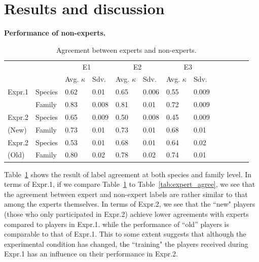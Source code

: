 \section{Results and discussion}
\label{sec:res}
\noindent
\textbf{Performance of non-experts.}
\begin{table}[t!]
\centering
\caption{Agreement between experts and non-experts. } 
\begin{tabular}{@{}l@{~~}l@{~~}l@{~~~}l@{~~}l@{~~~}l@{~~}l@{~~~}l@{~~}l@{~~~}l@{~~}l@{~~~}l@{~}l@{}}
\toprule
& & \multicolumn{2}{c}{E1} & \multicolumn{2}{c}{E2} & \multicolumn{2}{c}{E3}\\ 
& & Avg. $\kappa$ & Sdv. & Avg. $\kappa$ & Sdv. & Avg. $\kappa$ & Sdv. \\
\hline
Expr.1 & Species & 0.62 & 0.01 & 0.65 & 0.006 & 0.55 & 0.009 \\  
& Family & 0.83 & 0.008 & 0.81 & 0.01 & 0.72 & 0.009\\
\hline
Expr.2 & Species & 0.65 & 0.009 & 0.50 & 0.008 & 0.45 & 0.009\\
(New)& Family & 0.73 & 0.01 & 0.73 & 0.01 & 0.68 & 0.01\\
\hline
Expr.2 & Species &0.53 & 0.01& 0.68 & 0.01 & 0.64 & 0.02 \\
(Old)& Family & 0.80 & 0.02 & 0.78 & 0.02 & 0.74 & 0.01\\
\bottomrule
\end{tabular}
\label{tab:agree1}
\end{table}
%
Table~\ref{tab:agree1} shows the result of label agreement
at both species and family level. 
In terms of Expr.1, 
%
if we compare Table~\ref{tab:agree1} to Table~\ref{tab:expert_agree}, 
we see that the agreement between expert and non-expert labels are rather similar to that among the experts themselves.
%
In terms of Expr.2, we see that the ``new" players (those who only participated in Expr.2)
achieve lower agreements with experts compared to players in Expr.1. 
%
while the performance of ``old'' players is comparable to that of Expr.1.
This to some extent suggests that although the experimental condition has changed, 
the ``training" the players received during Expr.1 has an influence on their performance in Expr.2. 


